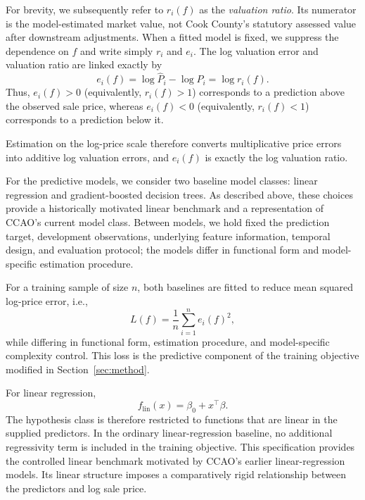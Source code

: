 \documentclass[10pt]{article}
\theoremstyle{definition}
\newcommand{\1}{\mathbf{1}}
\begin{document}
{For brevity, we subsequently refer to $r_i(f)$ as the \emph{valuation ratio}. Its numerator is the model-estimated market value, not Cook County's statutory assessed value after downstream adjustments. When a fitted model is fixed, we suppress the dependence on $f$ and write simply $r_i$ and $e_i$. The log valuation error and valuation ratio are linked exactly by}
\begin{equation}
\label{eq:log_ratio}
e_i(f)
=
\log \widehat{P}_i-\log P_i
=
\log r_i(f).
\end{equation}
Thus, $e_i(f)>0$ (equivalently, $r_i(f)>1$) corresponds to a prediction above the observed sale price, whereas $e_i(f)<0$ (equivalently, $r_i(f)<1$) corresponds to a prediction below it.

{Estimation on the log-price scale therefore converts multiplicative price errors into additive log valuation errors, and $e_i(f)$ is exactly the log valuation ratio.}

For the predictive models, we consider two baseline model classes: linear regression and gradient-boosted decision trees. As described above, these choices provide a historically motivated linear benchmark and a representation of CCAO's current model class. Between models, we hold fixed the prediction target, development observations, underlying feature information, temporal design, and evaluation protocol; the models differ in functional form and model-specific estimation procedure.

For a training sample of size $n$, both baselines are fitted to reduce mean squared log-price error, i.e.,
\begin{equation}
\label{eq:baseline_learning}
L(f)
=
\frac{1}{n}\sum_{i=1}^n e_i(f)^2,
\end{equation}
while differing in functional form, estimation procedure, and model-specific complexity control. This loss is the predictive component of the training objective modified in Section~\ref{sec:method}.

For linear regression,
\begin{equation}
\label{eq:linear_model}
f_{\mathrm{lin}}(x)
=
\beta_0+x^\top\beta.
\end{equation}
The hypothesis class is therefore restricted to functions that are linear in the supplied predictors. In the ordinary linear-regression baseline, no additional regressivity term is included in the training objective. This specification provides the controlled linear benchmark motivated by CCAO's earlier linear-regression models. Its linear structure imposes a comparatively rigid relationship between the predictors and log sale price.
\end{document}
